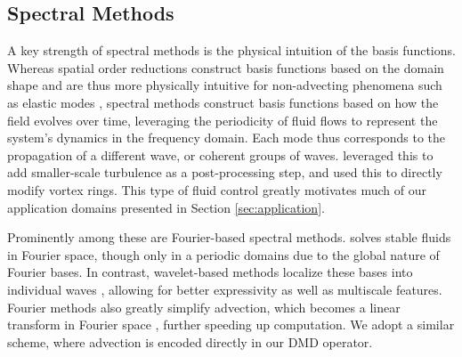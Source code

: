 
\subsection{Spectral Methods}


A key strength of spectral methods is the physical intuition of the basis functions. 
Whereas spatial order reductions construct basis functions based on the domain shape and are thus more physically intuitive for non-advecting phenomena such as elastic modes \cite{brandt2017compressed, sellan2023breaking}, spectral methods construct basis functions based on how the field evolves over time, 
%
%
leveraging the periodicity of fluid flows to represent the system's dynamics in the frequency domain.
%
Each mode thus corresponds to the propagation of a different wave, or coherent groups of waves. \citet{kim2008wavelet} leveraged this to add smaller-scale turbulence as a post-processing step, and \citet{chern2017inside} used this to directly modify vortex rings. 
This type of fluid control greatly motivates much of our application domains presented in Section \ref{sec:application}.


Prominently among these are Fourier-based spectral methods. \citet{stam2001simple} solves stable fluids in Fourier space, though only in a periodic domains due to the global nature of Fourier bases. 
In contrast, wavelet-based methods localize these bases into individual waves \cite{jeschke2018water}, allowing for better expressivity as well as multiscale features. 
Fourier methods also greatly simplify advection, which becomes a linear transform in Fourier space \cite{chern2016schrodinger}, further speeding up computation. We adopt a similar scheme, where advection is encoded directly in our DMD operator.


